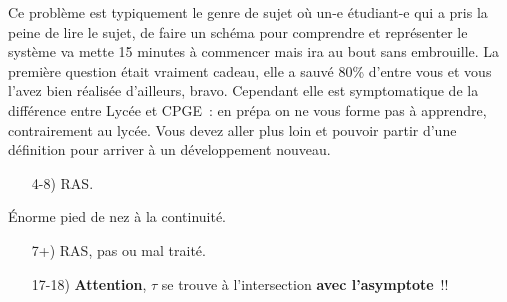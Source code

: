 \documentclass[a4paper, 10pt, final, garamond]{book}
\begin{document}
\setcounter{section}{0}
Ce problème est typiquement le genre de sujet où un-e étudiant-e qui a pris la
peine de lire le sujet, de faire un schéma pour comprendre et représenter le
système va mette 15 minutes à commencer mais ira au bout sans embrouille.
\smallbreak
La première question était vraiment cadeau, elle a sauvé 80\% d'entre vous et
vous l'avez bien réalisée d'ailleurs, bravo. Cependant elle est symptomatique de
la différence entre Lycée et CPGE~: en prépa on ne vous forme pas à apprendre,
contrairement au lycée. Vous devez aller plus loin et pouvoir partir d'une
définition pour arriver à un développement nouveau.
\begin{enumerate}
	 Résistance infinie $\Ra i=0 \Ra$ dipôle équivalent à un
	interrupteur ouvert.
	 Lecture de l'énoncé. \textbf{Attention}, n'appliquez pas $\ln (~)$
	sur des nombres négatifs~! $-\exr^{-t/\tau_1} = \frac{U_a}{E}-1$ ne se passe
	pas au $\ln $, il faut l'appliquer sur $\exr^{-t/\tau_1} = 1 - \frac{U_a}{E} =
		\frac{E-U_a}{E}$. Il faut prendre l'habitude de \textbf{simplifier}~: avoir
	l'expression littérale d'un temps qui commence par $t_a = -\ln (~)$ c'est
	\textit{très} inquiétant puisqu'un temps est positif.
	 Exercice des plus classiques~: RC avec une maille parallèle. Donc
	un nœud, donc une LdN. Un peu moins classique, mais clair avec un schéma, la
	condition initale est en $t=t_a$ et n'est pas $E$~!
	\item[4-8)]{} RAS.
\end{enumerate}

Énorme pied de nez à la continuité.
\begin{enumerate}
	 \textbf{NON}, $u$ n'est \textbf{PAS CONTINU} dans un circuit avec
	une bobine~!!! Pour trouver les CI, schéma et LdM.
	 Bobine en RP $\equiv$ fil. LdM.
	 Ne vous précipitez pas, ça n'est pas un RL typique du cours. Il y a
	deux résistances.
	 RAS, TB.
	 Deux choix, comme dans le cours. Une seule bonne réponse.
	 Deux points gratuits pour les asymptotes, mais grosses
	incompréhensions de $\tau$ ou $5\tau$.
	\item[7+)]{} RAS, pas ou mal traité.
	\item[17-18)] \textbf{Attention}, $\tau$ se trouve à l'intersection
		\textbf{avec l'asymptote}~!!
\end{enumerate}
\end{document}
